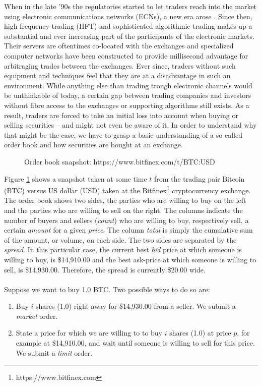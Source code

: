 When in the late '90s the regulatories started to let traders reach into the market using electronic communications networks (ECNs), a new era arose \cite{patterson2012dark}.
Since then, high frequency trading (HFT) and sophisticated algorithmic trading makes up a substantial and ever increasing part of the participants of the electronic markets. 
Their servers are oftentimes co-located with the exchanges and specialized computer networks have been constructed to provide millisecond advantage for arbitraging trades between the exchanges. 
Ever since, traders without such equipment and techniques feel that they are at a disadvantage in such an environment. \cite{patterson2012dark}
While anything else than trading trough electronic channels would be unthinkable of today, a certain gap between trading companies and investors without fibre access to the exchanges or supporting algorithms still exists.
As a result, traders are forced to take an initial loss into account when buying or selling securities -- and might not even be aware of it.
In order to understand why that might be the case, we have to grasp a basic understanding of a so-called order book and how securities are bought at an exchange.

\begin{figure}[H]
    \centering
    \caption{Order book snapshot: https://www.bitfinex.com/t/BTC:USD}
    \label{fig:intro-orderbook}
\end{figure}

Figure \ref{fig:intro-orderbook} shows a snapshot taken at some time $t$ from the trading pair Bitcoin (BTC) versus US dollar (USD) taken at the Bitfinex\footnote{https://www.bitfinex.com} cryptocurrency exchange.
The order book shows two sides, the parties who are willing to buy on the left and the parties who are willing to sell on the right.
The columns indicate the number of buyers and sellers (\textit{count}) who are willing to buy, respectively sell, a certain \textit{amount} for a given \textit{price}.
The column \textit{total} is simply the cumulative sum of the amount, or volume, on each side.
The two sides are separated by the \textit{spread}. 
In this particular case, the current best \textit{bid} price at which someone is willing to buy, is \$14,910.00 and the best ask-price at which someone is willing to sell, is \$14,930.00. 
Therefore, the spread is currently \$20.00 wide.
\\
\\
Suppose we want to buy 1.0 BTC.
Two possible ways to do so are:
\begin{enumerate}
    \item Buy $i$ shares (1.0) right away for \$14,930.00 from a seller. We submit a \textit{market} order.
    \item State a price for which we are willing to to buy $i$ shares (1.0) at price $p$, for example at \$14,910.00, and wait until someone is willing to sell for this price. We submit a \textit{limit} order.
\end{enumerate}

